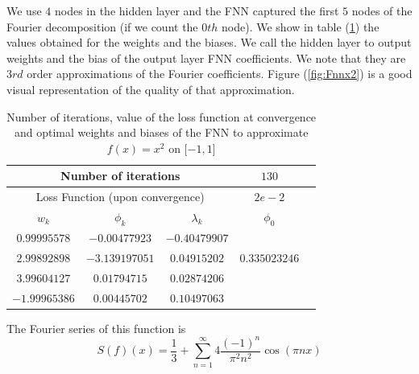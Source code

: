 \documentclass[AMS,STIX1COL]{WileyNJD-v2}
\begin{document}
We use $4$ nodes in the hidden layer and the FNN captured the first $5$ nodes of the Fourier decomposition (if we count the $0th$ node). We show in table (\ref{tab:tabfnnx2}) the values obtained for the weights and the biases. We call the hidden layer to output weights and the bias of the output layer FNN coefficients. We note that they are $3rd$ order approximations of the Fourier coefficients. Figure (\ref{fig:Fnnx2}) is a good visual representation of the quality of that approximation.
\begin{table}[!h]
  \begin{center}
  \begin{tabular}{ |c|c|c|c|c| } 
    \hline
\multicolumn{3}{|c|}{Number of iterations}& $130$  \\
\hline
  \multicolumn{3}{|c|}{Loss Function (upon convergence)} & $2e-2$  \\
\hline
\hline
$w_k$ & $\phi_k$ & $\lambda_k$& $\phi_0$ \\
\hline
$0.99995578$ & $-0.00477923$ &$-0.40479907$& \\ 
$2.99892898$&$-3.139197051$ & $0.04915202$& $0.335023246$ \\ 
$3.99604127$& $0.01794715$ & $0.02874206$& \\ 
$ -1.99965386$& $0.00445702$ & $ 0.10497063$& \\ 
\hline
\end{tabular}
\caption{\;Number of iterations, value of the loss function at convergence and optimal weights and biases of the FNN to approximate $ f(x) = x^2$ on $[-1, 1$]}\label{tab:tabfnnx2}
\end{center}
\end{table}
The Fourier series of this function is
$$
S(f)(x)= \frac{1}{3} + \sum_{n=1}^{\infty} 4 \frac{(-1)^n}{\pi^2 n^2} \cos(\pi nx)
$$
\end{document}
